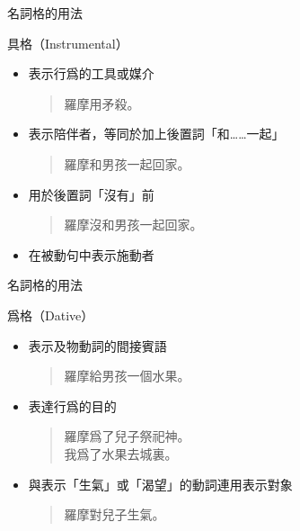 \documentclass[aspectratio=169]{beamer}
\begin{document}
\begin{frame}{名詞格的用法}
    \begin{block}{具格（Instrumental）}
        \begin{itemize}
            \item 表示行爲的工具或媒介\\
            \begin{quotation}\rmfamily
                 羅摩用矛殺。
            \end{quotation}
            \item 表示陪伴者，等同於加上後置詞「和……一起」\\
            \begin{quotation}\rmfamily
                 羅摩和男孩一起回家。
            \end{quotation}
            \item 用於後置詞「沒有」前\\
            \begin{quotation}\rmfamily
                 羅摩沒和男孩一起回家。
            \end{quotation}
            \item 在被動句中表示施動者
        \end{itemize}
    \end{block}
\end{frame}

\begin{frame}{名詞格的用法}
    \begin{block}{爲格（Dative）}
        \begin{itemize}
            \item 表示及物動詞的間接賓語\\
            \begin{quotation}
                \rmfamily
                 羅摩給男孩一個水果。
            \end{quotation}
            \item 表達行爲的目的\\
            \begin{quotation}
                \rmfamily
                 羅摩爲了兒子祭祀神。\\
                 我爲了水果去城裏。
            \end{quotation}
            \item 與表示「生氣」或「渴望」的動詞連用表示對象\\
            \begin{quotation}
                \rmfamily
                 羅摩對兒子生氣。
            \end{quotation}
        \end{itemize}
    \end{block}
\end{frame}
\end{document}
